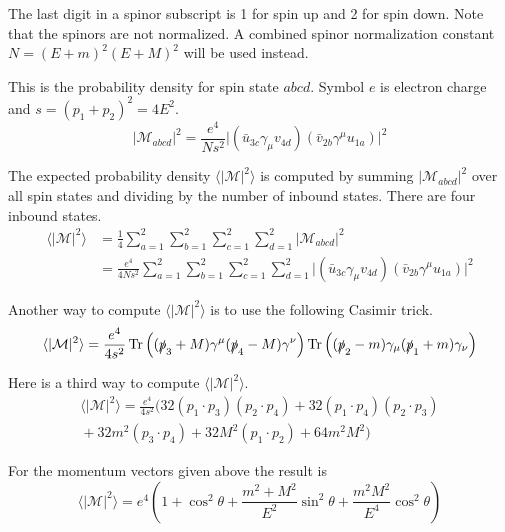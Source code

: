 \documentclass[12pt]{article}
\begin{document}
\noindent
The last digit in a spinor subscript is 1 for spin up and 2 for spin down.
Note that the spinors are not normalized.
A combined spinor normalization constant $N=(E+m)^2(E+M)^2$
will be used instead.

\bigskip
\noindent
This is the probability density for spin state $abcd$.
Symbol $e$ is electron charge and $s=(p_1+p_2)^2=4E^2$.
\begin{equation*}
\big|\mathcal{M}_{abcd}\big|^2
=\frac{e^4}{Ns^2}\big|(\bar{u}_{3c}\gamma_\mu v_{4d})(\bar{v}_{2b}\gamma^\mu u_{1a})\big|^2
\end{equation*}

\noindent
The expected probability density $\langle|\mathcal{M}|^2\rangle$
is computed by summing $|\mathcal{M}_{abcd}|^2$ over all spin states
and dividing by the number of inbound states.
There are four inbound states.
\begin{align*}
\langle|\mathcal{M}|^2\rangle
&=\frac{1}{4}\sum_{a=1}^2\sum_{b=1}^2\sum_{c=1}^2\sum_{d=1}^2\big|\mathcal{M}_{abcd}\big|^2
\\
&=\frac{e^4}{4Ns^2}\sum_{a=1}^2\sum_{b=1}^2\sum_{c=1}^2\sum_{d=1}^2
\big|(\bar{u}_{3c}\gamma_\mu v_{4d})(\bar{v}_{2b}\gamma^\mu u_{1a})\big|^2
\end{align*}

\noindent
Another way to compute $\langle|\mathcal{M}|^2\rangle$ is to use the following Casimir trick.
\begin{equation*}
\langle|\mathcal{M}|^2\rangle
=\frac{e^4}{4s^2}
\mathop{\rm Tr}\left((\slashed{p}_3+M)\gamma^\mu(\slashed{p}_4-M)\gamma^\nu\right)
\mathop{\rm Tr}\left((\slashed{p}_2-m)\gamma_\mu(\slashed{p}_1+m)\gamma_\nu\right)
\end{equation*}

\noindent
Here is a third way to compute $\langle|\mathcal{M}|^2\rangle$.
\begin{multline*}
\langle|\mathcal{M}|^2\rangle
=\frac{e^4}{4s^2}
\bigg(
32 (p_1\cdot p_3) (p_2\cdot p_4) +
32 (p_1\cdot p_4) (p_2\cdot p_3)
\\
{}+32 m^2 (p_3\cdot p_4) +
32 M^2 (p_1\cdot p_2) +
64 m^2 M^2
\bigg)
\end{multline*}

\noindent
For the momentum vectors given above the result is
\begin{equation*}
\langle|\mathcal{M}|^2\rangle
=e^4\left(1+\cos^2\theta+\frac{m^2+M^2}{E^2}\sin^2\theta+\frac{m^2M^2}{E^4}\cos^2\theta\right)
\end{equation*}
\end{document}
